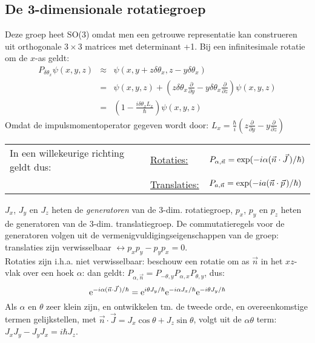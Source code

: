 \subsection{De 3-dimensionale rotatiegroep}
Deze groep heet SO(3) omdat men een getrouwe representatie kan construeren
uit orthogonale $3\times3$ matrices met determinant +1.
\npar
Bij een infinitesimale rotatie om de $x$-as geldt:
\begin{eqnarray*}
P_{\delta\theta_x}\psi(x,y,z)&\approx&\psi(x,y+z\delta\theta_x,z-y\delta\theta_x)\\
&=&\psi(x,y,z)+\left(z\delta\theta_x\frac{\partial}{\partial y}-y\delta\theta_x\frac{\partial}{\partial z}\right)\psi(x,y,z)\\
&=&\left(1-\frac{i\delta\theta_xL_x}{\hbar}\right)\psi(x,y,z)
\end{eqnarray*}
Omdat de impulsmomentoperator gegeven wordt door:
$\displaystyle L_x=\frac{\hbar}{i}
\left(z\frac{\partial}{\partial y}-y\frac{\partial}{\partial z}\right)$
\npar
\begin{tabular}[t]{lll}
In een willekeurige richting geldt dus:
&\underline{Rotaties:}&$P_{\alpha,\vec{n}}=\exp(-i\alpha(\vec{n}\cdot\vec{J}\hspace{0.5mm})/\hbar)$\\
&\underline{Translaties:}&$P_{a,\vec{n}}=\exp(-ia(\vec{n}\cdot\vec{p}\hspace{0.5mm})/\hbar)$\\
\end{tabular}
\npar
$J_x$, $J_y$ en $J_z$ heten de {\it generatoren} van de 3-dim. rotatiegroep,
$p_x$, $p_y$ en $p_z$ heten de generatoren van de 3-dim. translatiegroep.
\npar
De commutatieregels voor de generatoren volgen uit de vermenigvuldigingseigenschappen
van de groep: translaties zijn verwisselbaar $\leftrightarrow p_xp_y-p_yp_x=0$.\\
Rotaties zijn i.h.a. niet verwisselbaar: beschouw een rotatie om as $\vec{n}$
in het $xz$-vlak over een hoek $\alpha$: dan geldt:
$P_{\alpha,\vec{n}}=P_{-\theta,y}P_{\alpha,x}P_{\theta,y}$, dus:
\[
{\rm e}^{-i\alpha(\vec{n}\cdot\vec{J}\,)/\hbar}=
{\rm e}^{i\theta J_y/\hbar}{\rm e}^{-i\alpha J_x/\hbar}{\rm e}^{-i\theta J_y/\hbar}
\]
Als $\alpha$ en $\theta$ zeer klein zijn, en ontwikkelen tm. de tweede orde,
en overeenkomstige termen gelijkstellen, met $\vec{n}\cdot\vec{J}=J_x\cos\theta+J_z\sin\theta$,
volgt uit de $\alpha\theta$ term: $J_xJ_y-J_yJ_x=i\hbar J_z$.

